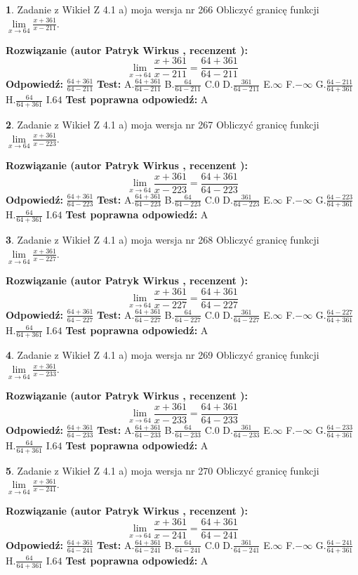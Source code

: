 \documentclass[12pt, a4paper]{article}
\theoremstyle{definition} %
\newtheorem{zad}{}
\newcommand{\zadStart}[1]{\begin{zad}#1\newline}
\newcommand{\zadStop}{\end{zad}}
\newcommand{\rozwStart}[2]{\noindent \textbf{Rozwiązanie (autor #1 , recenzent #2): }\newline}
\newcommand{\rozwStop}{\newline}
\newcommand{\odpStart}{\noindent \textbf{Odpowiedź:}\newline}
\newcommand{\odpStop}{\newline}
\newcommand{\testStart}{\noindent \textbf{Test:}\newline}
\newcommand{\testStop}{\newline}
\newcommand{\kluczStart}{\noindent \textbf{Test poprawna odpowiedź:}\newline}
\newcommand{\kluczStop}{\newline}
\begin{document}
\zadStart{Zadanie z Wikieł Z 4.1 a) moja wersja nr 266}
Obliczyć granicę funkcji $\lim\limits_{x\to64}\frac{x+361}{x-211}$.
\zadStop
\rozwStart{Patryk Wirkus}{}
$$\lim\limits_{x\to64}\frac{x+361}{x-211} = \frac{64+361}{64-211}$$
\rozwStop
\odpStart
$\frac{64+361}{64-211}$
\odpStop
\testStart
A.$\frac{64+361}{64-211}$
B.$\frac{64}{64-211}$
C.$0$
D.$\frac{361}{64-211}$
E.$\infty$
F.$-\infty$
G.$\frac{64-211}{64+361}$
H.$\frac{64}{64+361}$
I.$64$
\testStop
\kluczStart
A
\kluczStop



\zadStart{Zadanie z Wikieł Z 4.1 a) moja wersja nr 267}
Obliczyć granicę funkcji $\lim\limits_{x\to64}\frac{x+361}{x-223}$.
\zadStop
\rozwStart{Patryk Wirkus}{}
$$\lim\limits_{x\to64}\frac{x+361}{x-223} = \frac{64+361}{64-223}$$
\rozwStop
\odpStart
$\frac{64+361}{64-223}$
\odpStop
\testStart
A.$\frac{64+361}{64-223}$
B.$\frac{64}{64-223}$
C.$0$
D.$\frac{361}{64-223}$
E.$\infty$
F.$-\infty$
G.$\frac{64-223}{64+361}$
H.$\frac{64}{64+361}$
I.$64$
\testStop
\kluczStart
A
\kluczStop



\zadStart{Zadanie z Wikieł Z 4.1 a) moja wersja nr 268}
Obliczyć granicę funkcji $\lim\limits_{x\to64}\frac{x+361}{x-227}$.
\zadStop
\rozwStart{Patryk Wirkus}{}
$$\lim\limits_{x\to64}\frac{x+361}{x-227} = \frac{64+361}{64-227}$$
\rozwStop
\odpStart
$\frac{64+361}{64-227}$
\odpStop
\testStart
A.$\frac{64+361}{64-227}$
B.$\frac{64}{64-227}$
C.$0$
D.$\frac{361}{64-227}$
E.$\infty$
F.$-\infty$
G.$\frac{64-227}{64+361}$
H.$\frac{64}{64+361}$
I.$64$
\testStop
\kluczStart
A
\kluczStop



\zadStart{Zadanie z Wikieł Z 4.1 a) moja wersja nr 269}
Obliczyć granicę funkcji $\lim\limits_{x\to64}\frac{x+361}{x-233}$.
\zadStop
\rozwStart{Patryk Wirkus}{}
$$\lim\limits_{x\to64}\frac{x+361}{x-233} = \frac{64+361}{64-233}$$
\rozwStop
\odpStart
$\frac{64+361}{64-233}$
\odpStop
\testStart
A.$\frac{64+361}{64-233}$
B.$\frac{64}{64-233}$
C.$0$
D.$\frac{361}{64-233}$
E.$\infty$
F.$-\infty$
G.$\frac{64-233}{64+361}$
H.$\frac{64}{64+361}$
I.$64$
\testStop
\kluczStart
A
\kluczStop



\zadStart{Zadanie z Wikieł Z 4.1 a) moja wersja nr 270}
Obliczyć granicę funkcji $\lim\limits_{x\to64}\frac{x+361}{x-241}$.
\zadStop
\rozwStart{Patryk Wirkus}{}
$$\lim\limits_{x\to64}\frac{x+361}{x-241} = \frac{64+361}{64-241}$$
\rozwStop
\odpStart
$\frac{64+361}{64-241}$
\odpStop
\testStart
A.$\frac{64+361}{64-241}$
B.$\frac{64}{64-241}$
C.$0$
D.$\frac{361}{64-241}$
E.$\infty$
F.$-\infty$
G.$\frac{64-241}{64+361}$
H.$\frac{64}{64+361}$
I.$64$
\testStop
\kluczStart
A
\kluczStop
\end{document}
